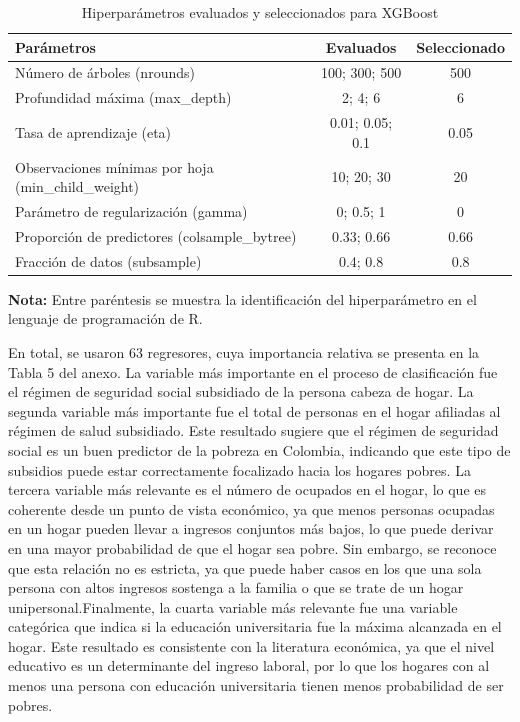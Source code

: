 \documentclass[a4paper]{article}
\theoremstyle{remark}
\theoremstyle{definition}
\begin{document}
\begin{table}[h!]
\centering
\caption{Hiperparámetros evaluados y seleccionados para XGBoost}
\label{tab:hiperparametros}
\begin{tabular}{|l|c|c|}
\hline
\textbf{Parámetros} & \textbf{Evaluados} & \textbf{Seleccionado} \\ \hline
Número de árboles (nrounds) & 100; 300; 500 & 500 \\ \hline
Profundidad máxima (max\_depth) & 2; 4; 6 & 6 \\ \hline
Tasa de aprendizaje (eta) & 0.01; 0.05; 0.1 & 0.05 \\ \hline
Observaciones mínimas por hoja (min\_child\_weight) & 10; 20; 30 & 20 \\ \hline
Parámetro de regularización (gamma) & 0; 0.5; 1 & 0 \\ \hline
Proporción de predictores (colsample\_bytree) & 0.33; 0.66 & 0.66 \\ \hline
Fracción de datos (subsample) & 0.4; 0.8 & 0.8 \\ \hline
\end{tabular}
\vspace{0.5mm}

\scriptsize
\textbf{Nota:} Entre paréntesis se muestra la identificación del hiperparámetro en el lenguaje de programación de R.
\end{table}

\vspace{0.5cm}

En total, se usaron 63 regresores, cuya importancia relativa se presenta en la Tabla 5 del anexo. La variable más importante en el proceso de clasificación fue el régimen de seguridad social subsidiado de la persona cabeza de hogar. La segunda variable más importante fue el total de personas en el hogar afiliadas al régimen de salud subsidiado. Este resultado sugiere que el régimen de seguridad social es un buen predictor de la pobreza en Colombia, indicando que este tipo de subsidios puede estar correctamente focalizado hacia los hogares pobres. La tercera variable más relevante es el número de ocupados en el hogar, lo que es coherente desde un punto de vista económico, ya que menos personas ocupadas en un hogar pueden llevar a ingresos conjuntos más bajos, lo que puede derivar en una mayor probabilidad de que el hogar sea pobre. Sin embargo, se reconoce que esta relación no es estricta, ya que puede haber casos en los que una sola persona con altos ingresos sostenga a la familia o que se trate de un hogar unipersonal.Finalmente, la cuarta variable más relevante fue una variable categórica que indica si la educación universitaria fue la máxima alcanzada en el hogar. Este resultado es consistente con la literatura económica, ya que el nivel educativo es un determinante del ingreso laboral, por lo que los hogares con al menos una persona con educación universitaria tienen menos probabilidad de ser pobres.
\end{document}
